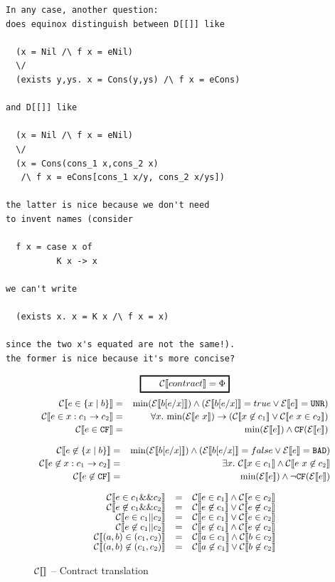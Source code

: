 \documentclass[preprint]{sigplanconf}
\begin{document}
\begin{verbatim}
In any case, another question: 
does equinox distinguish between D[[]] like

  (x = Nil /\ f x = eNil)
  \/
  (exists y,ys. x = Cons(y,ys) /\ f x = eCons)

and D[[]] like

  (x = Nil /\ f x = eNil)
  \/
  (x = Cons(cons_1 x,cons_2 x)
   /\ f x = eCons[cons_1 x/y, cons_2 x/ys])

the latter is nice because we don't need 
to invent names (consider

  f x = case x of
          K x -> x

we can't write

  (exists x. x = K x /\ f x = x)

since the two x's equated are not the same!). 
the former is nice because it's more concise?
\end{verbatim}

\begin{figure}
  $$ \ruleform{\ctrans{contract} = \Phi} $$
\begin{eqnarray*}
  \ctrans{e \in \{x \mid b \}} &=&  \min{\etrans{b[e/x]}} \land (\etrans{b[e/x]} = true \lor \etrans{e} = \unr)\\
  \ctrans{e \in x:c_1 \to c_2} &=& \forall x.~\min{\etrans{e~x}} \to (\ctrans{x \not \in c_1} \lor  \ctrans{e~x \in c_2})\\
  \ctrans{e \in \cfc} &=& \min{\etrans{e}} \land \cf{\etrans{e}}
\end{eqnarray*}

\begin{eqnarray*}
  \ctrans{e \not \in \{x \mid b \}} &=&  \min{\etrans{b[e/x]}} \land (\etrans{b[e/x]} = false \lor \etrans{e} = \bad)\\
  \ctrans{e \not \in x:c_1 \to c_2} &=& \exists x.~ \ctrans{x \in c_1} \land  \ctrans{e~x \not \in c_2}\\
  \ctrans{e \not \in \cfc} &=& \min{\etrans{e}} \land \lnot \cf{\etrans{e}}
\end{eqnarray*}

\begin{center}
\[  \begin{array}{rcl}
 \ctrans{e \in c_1 \&\& c_2} &=& \ctrans{e \in c_1} \land \ctrans{e \in c_2} \\
 \ctrans{e \not \in c_1 \&\& c_2} &=& \ctrans{e \not \in c_1} \lor \ctrans{e \not \in c_2}\\
 \ctrans{e \in c_1 || c_2} &=& \ctrans{e \in c_1} \lor \ctrans{e \in c_2} \\
  \ctrans{e \not \in c_1 || c_2} &=& \ctrans{e \not \in c_1} \land \ctrans{e \not \in c_2}\\
 \ctrans{(a,b) \in (c_1,c_2)}   &=& \ctrans{a \in c_1} \land \ctrans{b \in c_2} \\
 \ctrans{(a,b) \not \in (c_1,c_2)}   &=& \ctrans{a \not \in c_1} \lor \ctrans{b \not \in c_2} \\
\end{array} \]
\end{center}

\caption{$\ctrans{}$ -- Contract translation}
\label{ctrans}
\end{figure}
\end{document}
